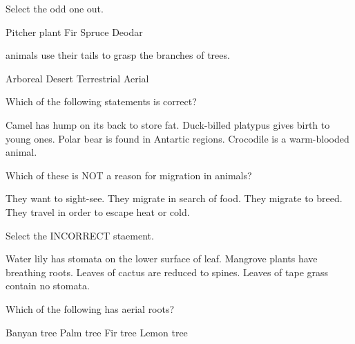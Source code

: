 \documentclass[a4paper,answers]{exam}
\begin{document}
\begin{questions}
    \question Select the odd one out.

    \begin{randomizeoneparchoices}
        \CorrectChoice Pitcher plant
        \choice Fir
        \choice Spruce
        \choice Deodar
    \end{randomizeoneparchoices}
    
    \question \fillin animals use their tails to grasp the branches of trees.

    \begin{randomizeoneparchoices}
        \CorrectChoice Arboreal
        \choice Desert
        \choice Terrestrial
        \choice Aerial
    \end{randomizeoneparchoices}
    
    \question Which of the following statements is correct?

    \begin{randomizechoices}
        \CorrectChoice Camel has hump on its back to store fat.
        \choice Duck-billed platypus gives birth to young ones.
        \choice Polar bear is found in Antartic regions.
        \choice Crocodile is a warm-blooded animal.
    \end{randomizechoices}
    
    \question Which of these is NOT a reason for migration in animals?

    \begin{randomizechoices}
        \CorrectChoice They want to sight-see.
        \choice They migrate in search of food.
        \choice They migrate to breed.
        \choice They travel in order to escape heat or cold.
    \end{randomizechoices}
    
    \question Select the INCORRECT staement.

    \begin{randomizechoices}
        \CorrectChoice Water lily has stomata on the lower surface of leaf.
        \choice Mangrove plants have breathing roots.
        \choice Leaves of cactus are reduced to spines.
        \choice Leaves of tape grass contain no stomata.
    \end{randomizechoices}
    
    \question Which of the following has aerial roots?

    \begin{randomizeoneparchoices}
        \CorrectChoice Banyan tree
        \choice Palm tree
        \choice Fir tree
        \choice Lemon tree
    \end{randomizeoneparchoices}


\end{questions}
\end{document}
